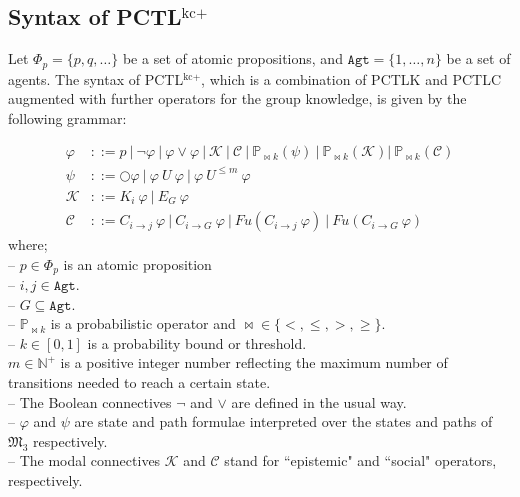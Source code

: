 \subsection{Syntax of PCTL$^{\textrm{kc+}}$} \label{def:syntax-PCTLKC+}

\begin{definition}\label{def:syntax-PCTLKC+}
Let $\Phi_p=\{p,q, \dots\}$ be a set of atomic propositions, and $\texttt{Agt}=\{1, \dots, n\}$ be a set of agents. The syntax of PCTL$^{\textrm{kc+}}$, which is a combination of PCTLK \cite{Wan2013} and PCTLC \cite{Sultan2014a,Sultan2013} augmented with further operators for the group knowledge, is given by the following grammar:

\vspace{-0.5cm}
\begin{align*}
    \varphi & ::= p~|~\neg \varphi~|~\varphi \vee \varphi~|~\mathcal{K}~|~\mathcal{C}~|~ \mathbb{P}_{\bowtie k} (\psi)~|~\mathbb{P}_{\bowtie k}(\mathcal{K})|~\mathbb{P}_{\bowtie k}(\mathcal{C})\\
    \psi & ::=\bigcirc \varphi ~ | ~ \varphi ~U~ \varphi~|~ \varphi~ U^{\leq m} ~ \varphi \\
    \mathcal{K} & ::= K_i ~\varphi ~|~ E_{G} ~\varphi\\
    \mathcal{C} & ::= C_{i\rightarrow j} ~\varphi ~| ~ C_{i\rightarrow G} ~\varphi ~| ~Fu(C_{i\rightarrow j} ~\varphi) ~| ~Fu(C_{i\rightarrow G} ~\varphi)
\end{align*}
%
where;\\
\noindent -- $p\in\Phi_p$ is an atomic proposition\\
\noindent -- $i,j \in \texttt{Agt}$.\\
\noindent -- $G\subseteq \texttt{Agt}$.\\
\noindent -- $\mathbb{P}_{\bowtie k}$ is a probabilistic operator and $\bowtie \in\{<,\leq,>,\ge\}$.\\
\noindent -- $k\in [0,1]$ is a probability bound or threshold.\\
$m \in\mathbb{N}^+ $ is a positive integer number reflecting the maximum number of transitions needed to reach a certain state.\\
\noindent -- The Boolean connectives $\neg$ and $\vee$ are defined in the usual way.\\
\noindent -- $\varphi$ and $\psi$ are state and path formulae interpreted over the states and paths of $\mathfrak{M_3}$ respectively.\\
\noindent -- The modal connectives $\mathcal{K}$ and $\mathcal{C}$ stand for ``epistemic" and ``social" operators, respectively.\\

\end{definition}
\vspace{-0.5cm}

